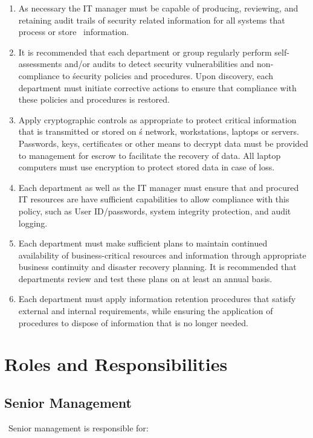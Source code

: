 \documentclass[sec]{policy}
\begin{document}
\begin{enumerate}[label = \Alph*.]
				\item As necessary the IT manager must be capable of producing, reviewing, and retaining audit trails of security related information for all systems that process or store \theOrganization\ information.
				\item It is recommended that each department or group regularly perform self-assessments and/or audits to detect security vulnerabilities and non-compliance to \theOrganization\' security policies and procedures. Upon discovery, each department must initiate corrective actions to ensure that compliance with these policies and procedures is restored. 
				\item Apply cryptographic controls as appropriate to protect critical information that is transmitted or stored on \theOrganization\'s network, workstations, laptops or servers.  Passwords, keys, certificates or other means to decrypt data must be provided to management for escrow to facilitate the recovery of data.  All laptop computers must use encryption to protect stored data in case of loss.
				\item Each department as well as the IT manager must ensure that and procured IT resources are have sufficient capabilities to allow compliance with this policy, such as User ID/passwords, system integrity protection, and audit logging.
				\item Each department must make sufficient plans to maintain continued availability of business-critical resources and information through appropriate business continuity and disaster recovery planning.  It is recommended that departments review and test these plans on at least an annual basis.
				\item Each department must apply information retention procedures that satisfy external and internal requirements, while ensuring the application of procedures to dispose of information that is no longer needed.
			\end{enumerate}
			
		\section{Roles and Responsibilities}
		
			\subsection{Senior Management}
			
				\theOrganization\ Senior management is responsible for:
				
\end{document}
